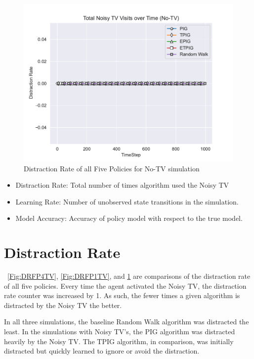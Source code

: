 \documentclass[12pt]{thesis}
\begin{document}
\begin{figure}
	\begin{center}
		\includegraphics[scale=0.8]{"images/Distraction_Rate_No-TV.pdf"}
	\end{center}
	\caption{Distraction Rate of all Five Policies for No-TV simulation}
	\label{Fig:DRFP0TV}
\end{figure}

\begin{itemize}[]
	\item Distraction Rate: Total number of times algorithm used the Noisy TV
	\item Learning Rate: Number of unobserved state transitions in the simulation.
	\item Model Accuracy: Accuracy of policy model with respect to the true model.
\end{itemize}

\section{Distraction Rate}
\figurename~\ref{Fig:DRFP4TV}, \ref{Fig:DRFP1TV}, and \ref{Fig:DRFP0TV} are comparisons of the distraction rate of all five policies. Every time the agent activated the Noisy TV, the distraction rate counter was increased by 1. As such, the fewer times a given algorithm is distracted by the Noisy TV the better.

In all three simulations, the baseline Random Walk algorithm was distracted the least. In the simulations with Noisy TV's, the PIG algorithm was distracted heavily by the Noisy TV. The TPIG algorithm, in comparison, was initially distracted but quickly learned to ignore or avoid the distraction.
\end{document}
